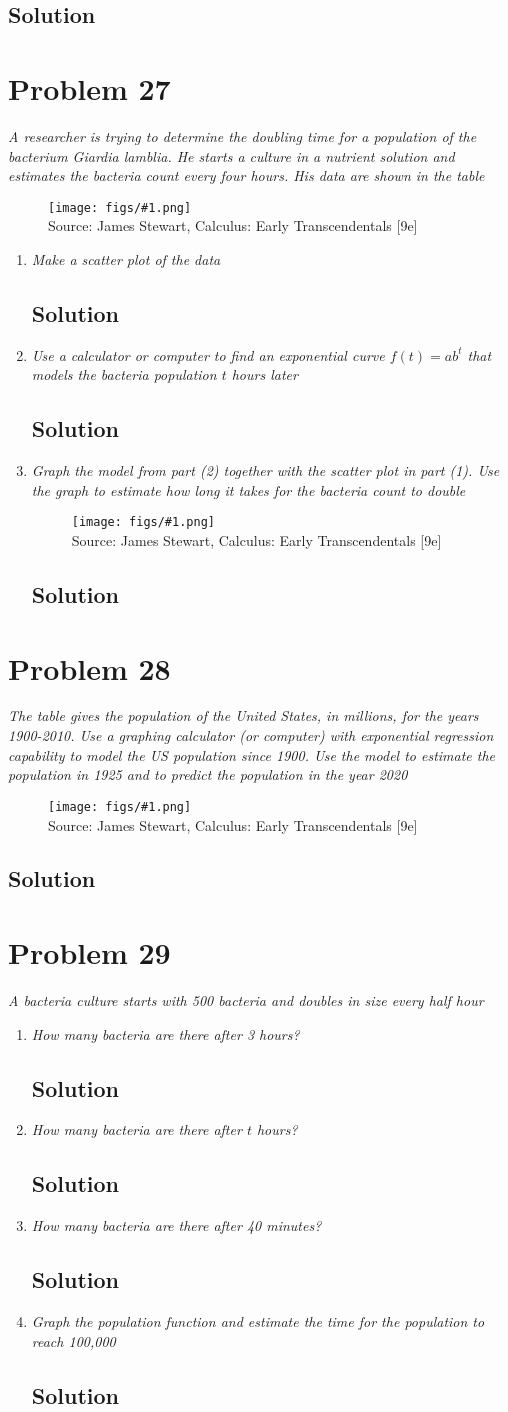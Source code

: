 \documentclass[11pt]{article}
\newcommand{\soln}{\subsection*}
\newcommand{\qn}{\textit}
\newcommand{\imagesource}[1]{{\footnotesize Source: #1}}
\newcommand{\imgqn}[1]{
	\begin{figure}[H]
		\centering
		\texttt{[image: figs/\#1.png]}\\
		\imagesource{James Stewart, Calculus: Early Transcendentals [9e]}
	\end{figure}
}
\begin{document}
\soln{Solution}

\section*{Problem 27}

\qn{A researcher is trying to determine the doubling time for a population of the bacterium \textit{Giardia lamblia}. He starts a culture in a nutrient solution and estimates the bacteria count every four hours. His data are shown in the table}
\imgqn{1.4.27}

\begin{enumerate}
	\item \qn{Make a scatter plot of the data}
	\soln{Solution}
	
	\item \qn{Use a calculator or computer to find an exponential curve $f(t)=ab^t$ that models the bacteria population $t$ hours later}
	\soln{Solution}
	
	\item \qn{Graph the model from part (2) together with the scatter plot in part (1). Use the graph to estimate how long it takes for the bacteria count to double}
	\imgqn{1.4.27.c}
	\soln{Solution}
\end{enumerate}

\section*{Problem 28}

\qn{The table gives the population of the United States, in millions, for the years 1900-2010. Use a graphing calculator (or computer) with exponential regression capability to model the US population since 1900. Use the model to estimate the population in 1925 and to predict the population in the year 2020}
\imgqn{1.4.28}

\soln{Solution}

\section*{Problem 29}

\qn{A bacteria culture starts with 500 bacteria and doubles in size every half hour}

\begin{enumerate}
	\item \qn{How many bacteria are there after 3 hours?}
	\soln{Solution}
	
	\item \qn{How many bacteria are there after $t$ hours?}
	\soln{Solution}
	
	\item \qn{How many bacteria are there after 40 minutes?}
	\soln{Solution}
	
	\item \qn{Graph the population function and estimate the time for the population to reach 100,000}
	\soln{Solution}
\end{enumerate}
\end{document}
